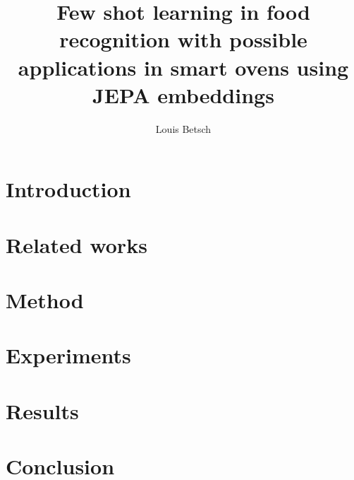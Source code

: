 \documentclass[12pt]{article}
\title{Few shot learning in food recognition with possible applications in smart ovens using JEPA embeddings}
\author{Louis Betsch}
\begin{document}
\maketitle


\clearpage

\tableofcontents
\clearpage

% 

\printnoidxglossary[type=\acronymtype]
\clearpage

\section{Introduction}
\label{sec:introduction}


\section{Related works}
\label{sec:related_works}


\section{Method}
\label{sec:method}


\section{Experiments}
\label{sec:experiments}


\section{Results}
\label{sec:results}


\section{Conclusion}
\label{sec:conclusion}


\clearpage

\printbibliography
\end{document}
